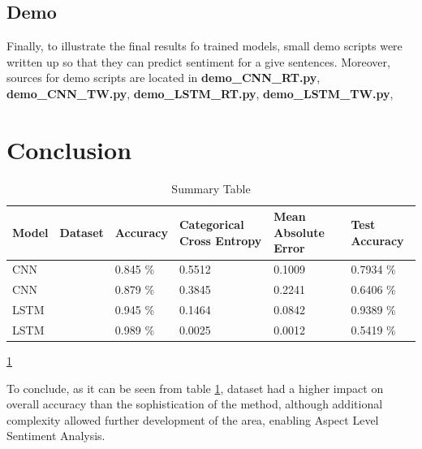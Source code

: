 \documentclass[conference]{IEEEtran}
\begin{document}
	\subsection{Demo}
		Finally, to illustrate the final results fo trained models, small demo scripts were written up so that they can predict sentiment for a give sentences. Moreover, sources for demo scripts are located in \textbf{demo\_CNN\_RT.py}, \textbf{demo\_CNN\_TW.py}, \textbf{demo\_LSTM\_RT.py}, \textbf{demo\_LSTM\_TW.py},

\section{Conclusion}

\begin{table}
	\centering
	\begin{tabular}{| m{1.1cm} | m{2cm} | m{1.1cm} | m{1.1cm} | m{1.1cm} |  m{1.1cm} | } 
		\hline
		Model & Dataset & Accuracy & Categorical Cross Entropy & Mean Absolute Error & Test Accuracy\\
		\hline
		CNN & \RT & 0.845 \% & 0.5512 & 0.1009 & 0.7934 \% \\ 
		\hline
		CNN & \TW & 0.879 \% & 0.3845 & 0.2241 & 0.6406 \% \\ 
		\hline
		LSTM & \RT & 0.945 \% & 0.1464 & 0.0842 & 0.9389 \% \\ 
		\hline
		LSTM & \TW & 0.989 \% & 0.0025 & 0.0012 & 0.5419 \% \\ 
		\hline
	\end{tabular}
	\caption{Summary Table}
	\label{table:5}
	\ref{table:5}
\end{table}

To conclude, as it can be seen from table \ref{table:5}, dataset had a higher impact on overall accuracy than the sophistication of the method, although additional complexity allowed further development of the area, enabling Aspect Level Sentiment Analysis.


%


\clearpage
\footnotesize{
	
}
\end{document}
